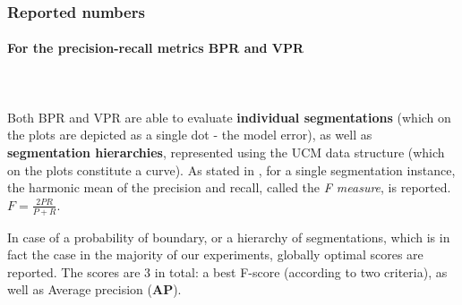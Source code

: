 
\subsubsection*{Reported numbers}
\paragraph*{For the precision-recall metrics BPR and VPR}\mbox{}\\\mbox{}\\
Both BPR and VPR are able to evaluate {\bf individual segmentations} (which on the plots are depicted as a single dot - the model error), as well as {\bf segmentation hierarchies}, represented using the UCM data structure (which on the plots constitute a curve). As stated in , for a single segmentation instance, the harmonic mean of the precision and recall, called the {\it F measure}, is reported. $F=\frac{2PR}{P+R}$.

In case of a probability of boundary, or a hierarchy of segmentations, which is in fact the case in the majority of our experiments, globally optimal scores %
are reported. The scores are 3 in total: a best F-score (according to two criteria), as well as Average precision (\textbf{AP}). 

